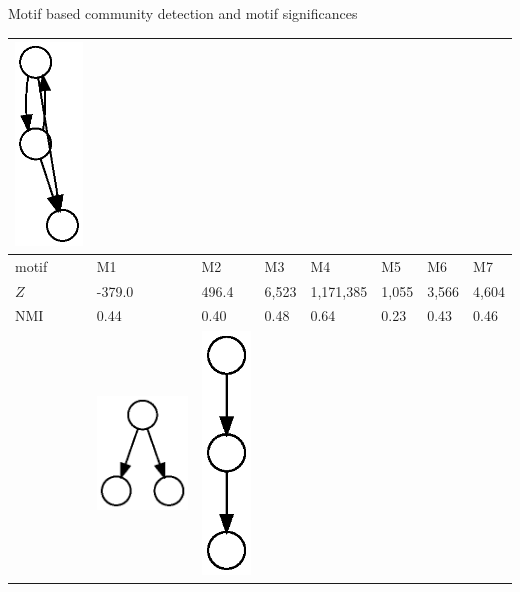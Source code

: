 \documentclass[unknownkeysallowed]{beamer}
\begin{document}
\begin{frame}{Motif based community detection and motif significances}
\begin{tabular}{l|lllllll}
    \includegraphics[height=0.10\textheight]{M7-plain} \\ \hline
    motif & M1 & M2 & M3 & M4 & M5 & M6 & M7
    \\ \hline
    $Z$ & -379.0 & 496.4 & 6,523 & 1,171,385 & 1,055 & 3,566 & 4,604 \\
    NMI & 0.44 & 0.40 & 0.48 & 0.64 & 0.23 & 0.43 & 0.46 \\ \hline \hline
    \noalign{\smallskip}
    &
    \includegraphics[height=0.10\textheight]{M8-plain} &
    \includegraphics[height=0.10\textheight]{M9-plain} &

\end{tabular}
\end{frame}
\end{document}
